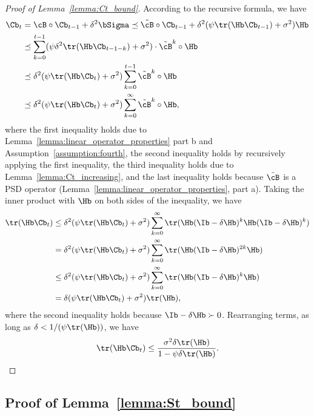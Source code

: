 \documentclass[11pt]{article}
\begin{document}
\begin{proof}[Proof of Lemma~\ref{lemma:Ct_bound}]
According to the recursive formula, we have
\begin{align*}
\Cb_t&=\cB\circ\Cb_{t-1}+\delta^2\bSigma\preceq\tilde\cB\circ\Cb_{t-1}+\delta^2(\psi\tr(\Hb\Cb_{t-1})+\sigma^2)\Hb\\
&\preceq\sum_{k=0}^{t-1}(\psi\delta^2\tr(\Hb\Cb_{t-1-k})+\sigma^2)\cdot\tilde\cB^k\circ\Hb\\
&\preceq\delta^2(\psi\tr(\Hb\Cb_t)+\sigma^2)\sum_{k=0}^{t-1}\tilde\cB^k\circ\Hb\\
&\preceq\delta^2(\psi\tr(\Hb\Cb_t)+\sigma^2)\sum_{k=0}^\infty\tilde\cB^k\circ\Hb,
\end{align*}
where the first inequality holds due to Lemma~\ref{lemma:linear_operator_properties} part b and Assumption~\ref{assumption:fourth}, the second inequality holds by recursively applying the first inequality, the third inequality holds due to Lemma~\ref{lemma:Ct_increasing}, and the last inequality holds because $\tilde\cB$ is a PSD operator (Lemma~\ref{lemma:linear_operator_properties}, part a). Taking the inner product with $\Hb$ on both sides of the inequality, we have
\begin{align*}
\tr(\Hb\Cb_t)&\le\delta^2(\psi\tr(\Hb\Cb_t)+\sigma^2)\sum_{k=0}^\infty\tr(\Hb(\Ib-\delta\Hb)^k\Hb(\Ib-\delta\Hb)^k)\\
&=\delta^2(\psi\tr(\Hb\Cb_t)+\sigma^2)\sum_{k=0}^\infty\tr(\Hb(\Ib-\delta\Hb)^{2k}\Hb)\\
&\le\delta^2(\psi\tr(\Hb\Cb_t)+\sigma^2)\sum_{k=0}^\infty\tr(\Hb(\Ib-\delta\Hb)^k\Hb)\\
&=\delta(\psi\tr(\Hb\Cb_t)+\sigma^2)\tr(\Hb),
\end{align*}
where the second inequality holds because $\Ib-\delta\Hb\succ0$. Rearranging terms, as long as $\delta<1/(\psi\tr(\Hb))$, we have
\begin{align*}
\tr(\Hb\Cb_t)\le\frac{\sigma^2\delta\tr(\Hb)}{1-\psi\delta\tr(\Hb)}.
\end{align*}
\end{proof}

\subsection{Proof of Lemma~\ref{lemma:St_bound}}\label{subsection:proof_St_bound}
\end{document}
